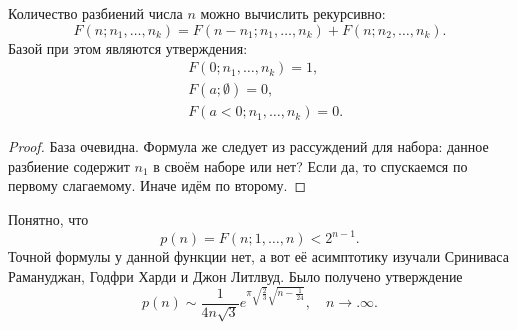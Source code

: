 \begin{theorem}
	Количество разбиений числа $n$ можно вычислить рекурсивно:
	\[
		F(n; n_1, \ldots, n_k) = F(n - n_1; n_1, \ldots, n_k) + F(n; n_2, \ldots, n_k).
	\]
	Базой при этом являются утверждения:
	\begin{align*}
		&F(0; n_1, \ldots, n_k) = 1,
		\\
		&F(a; \emptyset) = 0,
		\\
		&F(a < 0; n_1, \ldots, n_k) = 0.
	\end{align*}
\end{theorem}

\begin{proof}
	База очевидна. Формула же следует из рассуждений для набора: данное разбиение содержит $n_1$ в своём наборе или нет? Если да, то спускаемся по первому слагаемому. Иначе идём по второму.
\end{proof}

\begin{note}
	Понятно, что
	\[
		p(n) = F(n; 1, \ldots, n) < 2^{n - 1}.
	\]
	Точной формулы у данной функции нет, а вот её асимптотику изучали Сриниваса Рамануджан, Годфри Харди и Джон Литлвуд. Было получено утверждение
	\[
		p(n) \sim \frac{1}{4n\sqrt{3}} e^{\pi\sqrt{\frac{2}{3}}\sqrt{n - \frac{1}{24}}},\quad n \to. \infty.
	\]
\end{note}